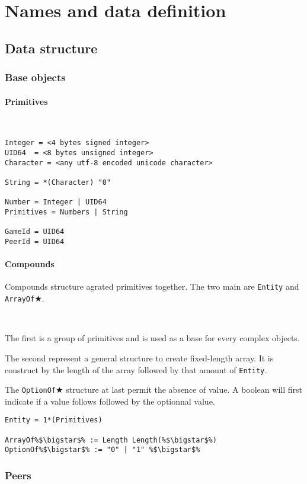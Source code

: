\section{Names and data definition}
\subsection{Data structure}

\subsubsection{Base objects}

\paragraph{Primitives}
~
\begin{lstlisting}
Integer = <4 bytes signed integer>
UID64  = <8 bytes unsigned integer>
Character = <any utf-8 encoded unicode character>

String = *(Character) "0"

Number = Integer | UID64
Primitives = Numbers | String

GameId = UID64
PeerId = UID64
\end{lstlisting}

\paragraph{Compounds} Compounds structure agrated primitives together. The two main are \verb+Entity+ and \verb+ArrayOf+$\bigstar$.

~

The first is a group of primitives and is used as a base for every complex objects.

The second represent a general structure to create fixed-length array. It is construct by the length of the array followed by that amount of \verb+Entity+.

The \verb+OptionOf+$\bigstar$ structure at last permit the absence of value. A boolean will first indicate if a value follows followed by the optionnal value.

\begin{lstlisting}[escapechar=\%]
Entity = 1*(Primitives)

ArrayOf%$\bigstar$% := Length Length(%$\bigstar$%)
OptionOf%$\bigstar$% := "0" | "1" %$\bigstar$%
\end{lstlisting}

\subsubsection{Peers}

